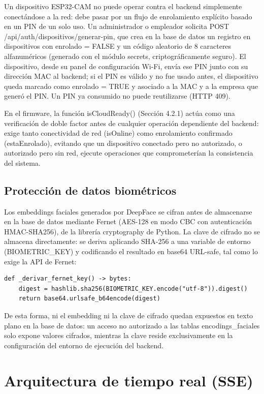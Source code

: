 Un dispositivo ESP32-CAM no puede operar contra el backend simplemente conectándose a la red: debe pasar por un flujo de enrolamiento explícito basado en un PIN de un solo uso. Un administrador o empleador solicita POST /api/auth/dispositivos/generar-pin, que crea en la base de datos un registro en dispositivos con enrolado = FALSE y un código aleatorio de 8 caracteres alfanuméricos (generado con el módulo secrets, criptográficamente seguro). El dispositivo, desde su panel de configuración Wi-Fi, envía ese PIN junto con su dirección MAC al backend; si el PIN es válido y no fue usado antes, el dispositivo queda marcado como enrolado = TRUE y asociado a la MAC y a la empresa que generó el PIN. Un PIN ya consumido no puede reutilizarse (HTTP 409).

En el firmware, la función isCloudReady() (Sección 4.2.1) actúa como una verificación de doble factor antes de cualquier operación dependiente del backend: exige tanto conectividad de red (isOnline) como enrolamiento confirmado (estaEnrolado), evitando que un dispositivo conectado pero no autorizado, o autorizado pero sin red, ejecute operaciones que comprometerían la consistencia del sistema.

\subsection{Protección de datos biométricos}

Los embeddings faciales generados por DeepFace se cifran antes de almacenarse en la base de datos mediante Fernet (AES-128 en modo CBC con autenticación HMAC-SHA256), de la librería cryptography de Python. La clave de cifrado no se almacena directamente: se deriva aplicando SHA-256 a una variable de entorno (BIOMETRIC\_KEY) y codificando el resultado en base64 URL-safe, tal como lo exige la API de Fernet:

\begin{verbatim}
def _derivar_fernet_key() -> bytes:
    digest = hashlib.sha256(BIOMETRIC_KEY.encode("utf-8")).digest()
    return base64.urlsafe_b64encode(digest)
\end{verbatim}

De esta forma, ni el embedding ni la clave de cifrado quedan expuestos en texto plano en la base de datos: un acceso no autorizado a las tablas encodings\_faciales solo expone valores cifrados, mientras la clave reside exclusivamente en la configuración del entorno de ejecución del backend.

\section{Arquitectura de tiempo real (SSE)}

